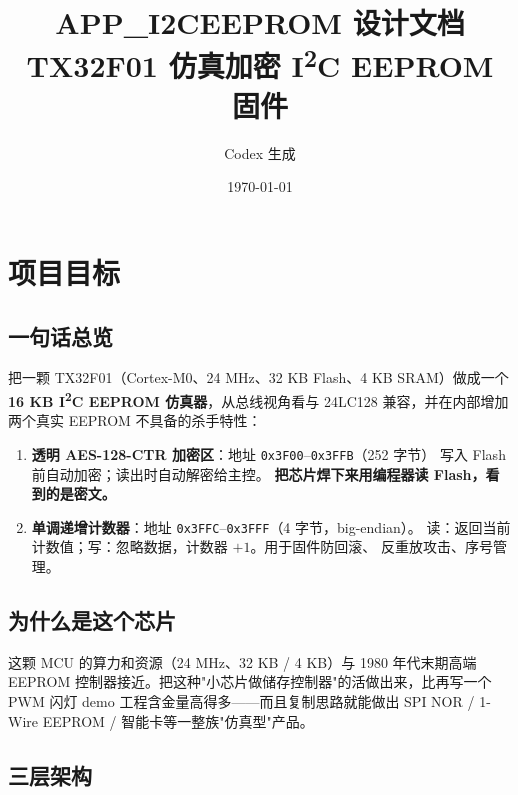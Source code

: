 \documentclass[UTF8,a4paper,11pt]{ctexart}
\title{APP\_I2CEEPROM 设计文档\\
       \large TX32F01 仿真加密 I\textsuperscript{2}C EEPROM 固件}
\author{Codex 生成}
\date{\today}
\newcommand{\hex}[1]{\texttt{0x#1}}
\begin{document}
\maketitle
\tableofcontents
\newpage

\section{项目目标}

\subsection{一句话总览}

把一颗 TX32F01（Cortex-M0、24 MHz、32 KB Flash、4 KB SRAM）做成一个
\textbf{16 KB I\textsuperscript{2}C EEPROM 仿真器}，从总线视角看与
24LC128 兼容，并在内部增加两个真实 EEPROM 不具备的杀手特性：

\begin{enumerate}
    \item \textbf{透明 AES-128-CTR 加密区}：地址 \hex{3F00}--\hex{3FFB}（252 字节）
          写入 Flash 前自动加密；读出时自动解密给主控。
          \textbf{把芯片焊下来用编程器读 Flash，看到的是密文。}
    \item \textbf{单调递增计数器}：地址 \hex{3FFC}--\hex{3FFF}（4 字节，big-endian）。
          读：返回当前计数值；写：忽略数据，计数器 $+1$。用于固件防回滚、
          反重放攻击、序号管理。
\end{enumerate}

\subsection{为什么是这个芯片}

这颗 MCU 的算力和资源（24 MHz、32 KB / 4 KB）与 1980 年代末期高端 EEPROM
控制器接近。把这种"小芯片做储存控制器"的活做出来，比再写一个 PWM 闪灯
demo 工程含金量高得多——而且复制思路就能做出 SPI NOR / 1-Wire EEPROM /
智能卡等一整族"仿真型"产品。

\subsection{三层架构}
\end{document}
